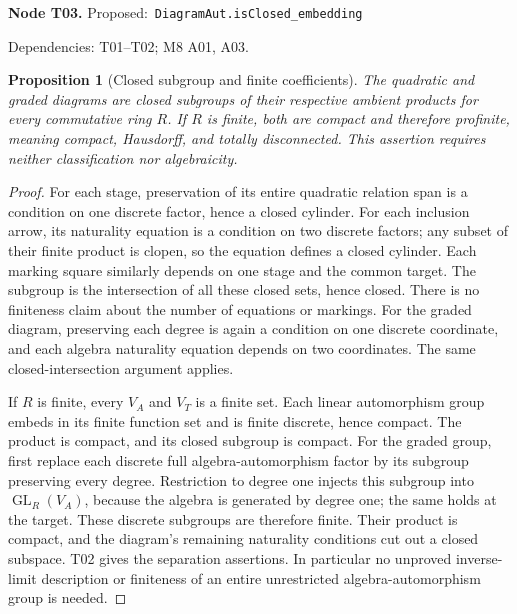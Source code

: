 \documentclass[11pt]{article}
\newtheorem{proposition}[theorem]{Proposition}
\theoremstyle{remark}\newtheorem{remark}[theorem]{Remark}
\newcommand{\GL}{\operatorname{GL}}
\newcommand{\code}[1]{{\normalfont\nolinkurl{#1}}}
\newcommand{\node}[3]{\par\Needspace{8\baselineskip}\smallskip\noindent\textbf{Node #1.}\quad
 \textsf{Proposed:}\ \code{#2}\par\noindent
 \textsf{Dependencies:} #3.\par\smallskip}
\begin{document}
\node{T03}{DiagramAut.isClosed_embedding}{T01--T02; M8 A01, A03}
\begin{proposition}[Closed subgroup and finite coefficients]\label{prop:t03}
The quadratic and graded diagrams are closed subgroups of their
respective ambient products for every commutative ring $R$.
If $R$ is finite, both are compact and therefore profinite, meaning
compact, Hausdorff, and totally disconnected.
This assertion requires neither classification nor algebraicity.
\end{proposition}
\begin{proof}
For each stage, preservation of its entire quadratic relation span is
a condition on one discrete factor, hence a closed cylinder. For each
inclusion arrow, its naturality equation is a condition on two discrete
factors; any subset of their finite product is clopen, so the equation
defines a closed cylinder. Each marking square similarly depends on
one stage and the common target. The subgroup is the intersection of
all these closed sets, hence closed. There is no finiteness claim about
the number of equations or markings. For the graded diagram, preserving
each degree is again a condition on one discrete coordinate, and each
algebra naturality equation depends on two coordinates. The same
closed-intersection argument applies.

If $R$ is finite, every $V_A$ and $V_T$ is a finite set. Each linear
automorphism group embeds in its finite function set and is finite
discrete, hence compact. The product is compact, and its closed subgroup
is compact. For the graded group, first replace each discrete full
algebra-automorphism factor by its subgroup preserving every degree.
Restriction to degree one injects this subgroup into $\GL_R(V_A)$,
because the algebra is generated by degree one; the same holds at the
target. These discrete subgroups are therefore finite. Their product
is compact, and the diagram's remaining naturality conditions cut out
a closed subspace. T02 gives the separation assertions. In particular
no unproved inverse-limit description or finiteness of an entire
unrestricted algebra-automorphism group is needed.
\end{proof}
\end{document}

